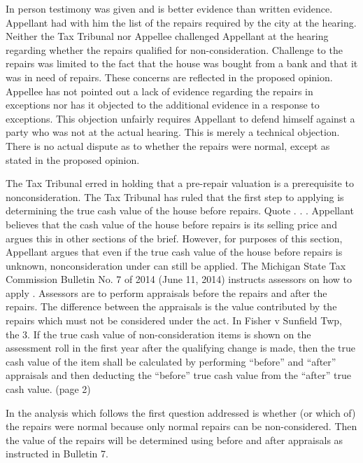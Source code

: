 In person testimony was given and is better evidence than written evidence.
Appellant had with him the list of the repairs required by the city at the hearing.
Neither the Tax Tribunal nor Appellee challenged Appellant at the hearing regarding whether the repairs qualified for non-consideration.
Challenge to the repairs was limited to the fact that the house was bought from a bank and that it was in need of repairs. These concerns are reflected in the proposed opinion.
Appellee has not pointed out a lack of evidence regarding the repairs in exceptions nor has it objected to the additional evidence in a response to exceptions.
This objection unfairly requires Appellant to defend himself against a party who was not at the actual hearing. 
This is merely a technical objection. There is no actual dispute as to whether the repairs were normal, except as stated in the proposed opinion.
 
The Tax Tribunal erred in holding that a pre-repair valuation is a prerequisite to  nonconsideration.
The Tax Tribunal has ruled that the first step to applying  is determining the true cash value of the house before repairs. Quote . . . 
Appellant believes that the cash value of the house before repairs is its selling price and argues this in other sections of the brief. However, for purposes of this section, Appellant argues that even if the true cash value of the house before repairs is unknown, nonconsideration under  can still be applied. 
The Michigan State Tax Commission Bulletin No. 7 of 2014 (June 11, 2014) instructs assessors on how to apply . Assessors are to perform appraisals before the repairs and after the repairs. The difference between the appraisals is the value contributed by the repairs which must not be considered under the act. 
In Fisher v Sunfield Twp, the 
3. If the true cash value of non-consideration items is shown on the assessment roll in the first year after the qualifying change is made, then the true cash value of the item shall be calculated by performing ``before'' and ``after'' appraisals and then deducting the ``before'' true cash value from the ``after'' true cash value. (page 2)
 
In the analysis which follows the first question addressed is whether (or which of) the repairs were normal because only normal repairs can be non-considered. Then the value of the repairs will be determined using before and after appraisals as instructed in Bulletin 7. 
 
